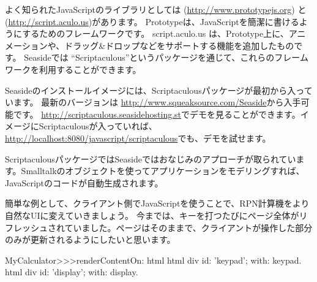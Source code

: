 \documentclass[a4paper,10pt,twoside]{book}
\begin{document}
よく知られたJavaScriptのライブラリとしては  (\url{http://www.prototypejs.org}) と  (\url{http://script.aculo.us})があります。
Prototypeは、JavaScriptを簡潔に書けるようにするためのフレームワークです。
script.aculo.us は、Prototype上に、アニメーションや、ドラッグ\&ドロップなどをサポートする機能を追加したものです。 Seasideでは ``Scriptaculous''というパッケージを通じて、これらのフレームワークを利用することができます。

Seasideのインストールイメージには、Scriptaculousパッケージが最初から入っています。
最新のバージョンは \url{http://www.squeaksource.com/Seaside}から入手可能です。
\url{http://scriptaculous.seasidehosting.st}でデモを見ることができます。イメージにScriptaculousが入っていれば、\url{http://localhost:8080/javascript/scriptaculous}でも、デモを試せます。

ScriptaculousパッケージではSeasideではおなじみのアプローチが取られています。Smalltalkのオブジェクトを使ってアプリケーションをモデリングすれば、JavaScriptのコードが自動生成されます。

簡単な例として、クライアント側でJavaScriptを使うことで、RPN計算機をより自然なUIに変えていきましょう。
今までは、キーを打つたびにページ全体がリフレッシュされていました。ページはそのままで、クライアントが操作した部分のみが更新されるようにしたいと思います。


\begin{code}{}
MyCalculator>>>renderContentOn: html
	html div id: 'keypad'; with: keypad.
	html div id: 'display'; with: display.	
\end{code}

\end{document}
